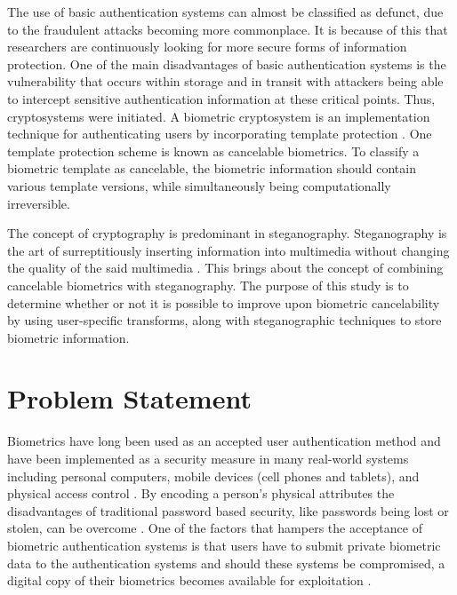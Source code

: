 The use of basic authentication systems can almost be classified as defunct, due to the fraudulent attacks becoming more commonplace. It is because of this that researchers are continuously looking for more secure forms of information protection. One of the main disadvantages of basic authentication systems is the vulnerability that occurs within storage and in transit with attackers being able to intercept sensitive authentication information at these critical points. Thus, cryptosystems were initiated. A biometric cryptosystem is an implementation technique for authenticating users by incorporating template protection \cite{Uludag2004}. One template protection scheme is known as cancelable biometrics. To classify a biometric template as cancelable, the biometric information should contain various template versions, while simultaneously being computationally irreversible. 

The concept of cryptography is predominant in steganography. Steganography is the art of surreptitiously inserting information into multimedia without changing the quality of the said multimedia \cite{Kishor2016}. This brings about the concept of combining cancelable biometrics with steganography.
The purpose of this study is to determine whether or not it is possible to improve upon biometric cancelability by using user-specific transforms, along with steganographic techniques to store biometric information.




\section{Problem Statement} %


Biometrics have long been used as an accepted user authentication method and have been implemented as a security measure in many real-world systems including personal computers, mobile devices (cell phones and tablets), and physical access control \cite{Liu2001}. By encoding a person’s physical attributes the disadvantages of traditional password based security, like passwords being lost or stolen, can be overcome \cite{Jain2016}. One of the factors that hampers the acceptance of biometric authentication systems is that users have to submit private biometric data to the authentication systems and should these systems be compromised, a digital copy of their biometrics becomes available for exploitation \cite{Rathgeb2011}.


